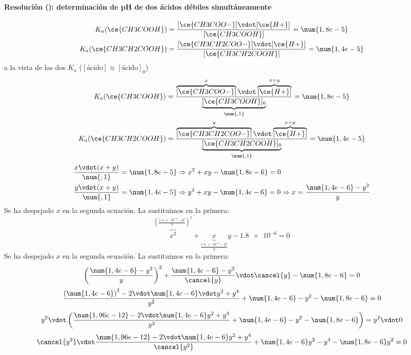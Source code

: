 \begin{frame}
	\frametitle{\ejerciciocmd}
	\framesubtitle{Resolución (): determinación de pH de dos ácidos débiles simultáneamente}
	\begin{overprint}
			$$
				\begin{aligned}
					K_a(\ce{CH3COOH})    &= \frac{[\ce{CH3COO-}]\vdot[\ce{H+}]}{[\ce{CH3COOH}]}=\num{1,8e-5}\\
					K_a(\ce{CH3CH2COOH}) &= \frac{[\ce{CH3CH2COO-}]\vdot[\ce{H+}]}{[\ce{CH3CH2COOH}]}=\num{1,4e-5}
				\end{aligned}
			$$
		\onslide<2>
			 a la vista de las dos $K_a$ ($[\text{ácido}]\approx[\text{ácido}]_0$)
			$$
				\begin{aligned}
					K_a(\ce{CH3COOH})    &= \frac{\overbrace{[\ce{CH3COO-}]}^x   \vdot\overbrace{[\ce{H+}]}^{x+y}}{\underbrace{[\ce{CH3COOH}]_0}_{\num{,1}}}   =\num{1,8e-5}\\
					K_a(\ce{CH3CH2COOH}) &= \frac{\overbrace{[\ce{CH3CH2COO-}]}^y\vdot\overbrace{[\ce{H+}]}^{x+y}}{\underbrace{[\ce{CH3CH2COOH}]_0}_{\num{,1}}}=\num{1,4e-5}
				\end{aligned}
			$$
		\onslide<3>
			$$
				\begin{aligned}
					\frac{x\vdot(x+y)}{\num{,1}} &= \num{1,8e-5}\Rightarrow x^2 + xy -\num{1,8e-6} = 0\\
					\frac{y\vdot(x+y)}{\num{,1}} &= \num{1,4e-5}\Rightarrow y^2 + xy -\num{1,4e-6} = 0\Rightarrow x = \frac{\num{1,4e-6}-y^2}{y}
				\end{aligned}
			$$
		\onslide<4>
			Se ha despejado $x$ en la segunda ecuación. La sustituimos en la primera:
			$$
				\overbrace{x^2}^{\left(\frac{\num{1,4e-6}-y^2}{y}\right)^2} + \underbrace{x}_{\frac{\num{1,4e-6}-y^2}{y}}y -\num{1,8e-6} = 0
			$$
		\onslide<5>
			Se ha despejado $x$ en la segunda ecuación. La sustituimos en la primera:
			$$
				\left(\frac{\num{1,4e-6}-y^2}{y}\right)^2 + \frac{\num{1,4e-6}-y^2}{\cancel{y}}\vdot\cancel{y} -\num{1,8e-6} = 0
			$$
		\onslide<6>
			$$
				\frac{{\left(\num{1,4e-6}\right)}^2 -2\vdot\num{1,4e-6}\vdot y^2 +y^4}{y^2} + \num{1,4e-6}-y^2 -\num{1,8e-6} = 0
			$$
		\onslide<7>
			$$
				y^2\vdot\left(\frac{\num{1,96e-12} -2\vdot\num{1,4e-6}y^2 +y^4}{y^2} + \num{1,4e-6}-y^2 -\num{1,8e-6}\right) = y^2\vdot 0
			$$
		\onslide<8>
			$$
				\cancel{y^2}\vdot\frac{\num{1,96e-12} -2\vdot\num{1,4e-6}y^2 +y^4}{\cancel{y^2}} + \num{1,4e-6}y^2-y^4 -\num{1,8e-6}y^2 = 0
$$
\end{overprint}
\end{frame}
